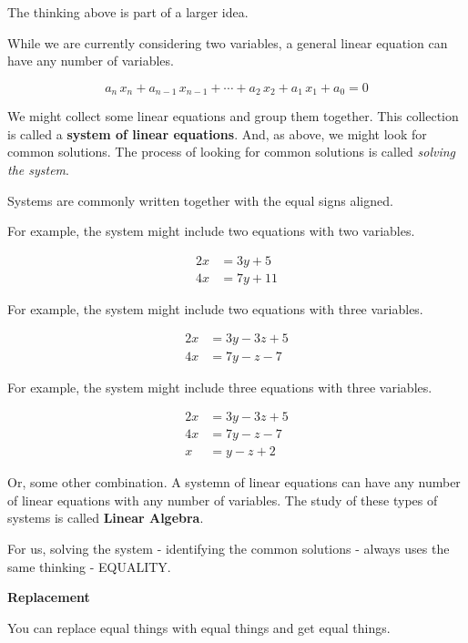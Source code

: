 \documentclass{ximera}
\begin{document}
The thinking above is part of a larger idea.


While we are currently considering two variables, a general linear equation can have any number of variables.


\[
a_n \, x_n + a_{n-1} \, x_{n-1} + \cdots + a_2 \, x_2 + a_1 \, x_1 + a_0 = 0
\]


We might collect some linear equations and group them together. This collection is called a \textbf{system of linear equations}. And, as above, we might look for common solutions.  The process of looking for common solutions is called \textit{solving the system}.





Systems are commonly written together with the equal signs aligned.

For example, the system might include two equations with two variables.

\begin{align*}
2x & = 3y + 5 \\
4x & = 7y + 11
\end{align*}



For example, the system might include two equations with three variables.

\begin{align*}
2x & = 3y - 3z + 5 \\
4x & = 7y - z - 7
\end{align*}




For example, the system might include three equations with three variables.

\begin{align*}
2x & = 3y - 3z + 5 \\
4x & = 7y - z - 7 \\
x & = y - z + 2 
\end{align*}


Or, some other combination. A systemn of linear equations can have any number of linear equations with any number of variables.  The study of these types of systems is called \textbf{Linear Algebra}.

For us, solving the system - identifying the common solutions - always uses the same thinking - EQUALITY.



\begin{fact} \textbf{\textcolor{purple!85!blue}{Replacement}} 

You can replace equal things with equal things and get equal things.

\end{fact}
\end{document}

